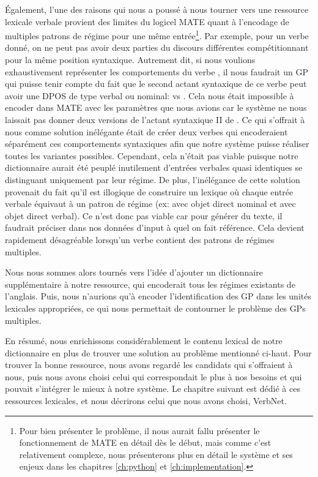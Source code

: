 Également, l'une des raisons qui nous a poussé à nous tourner vers une ressource lexicale verbale provient des limites du logicel MATE quant à l'encodage de multiples patrons de régime pour une même entrée\footnote{Pour bien présenter le problème, il nous aurait fallu présenter le fonctionnement de MATE en détail dès le début, mais comme c'est relativement complexe, nous présenterons plus en détail le système et ses enjeux dans les chapitres \ref{ch:python} et \ref{ch:implementation}.}. Par exemple, pour un verbe donné, on ne peut pas avoir deux parties du discours différentes compétitionnant pour la même position syntaxique. Autrement dit, si nous voulions exhaustivement représenter les comportements du verbe , il nous faudrait un \ac{GP} qui puisse tenir compte du fait que le second actant syntaxique de ce verbe peut avoir une \ac{DPOS} de type verbal ou nominal:  vs . Cela nous était impossible à encoder dans MATE avec les paramètres que nous avions car le système ne nous laissait pas donner deux versions de l'actant syntaxique II de . Ce qui s'offrait à nous comme solution inélégante était de créer deux verbes  qui encoderaient séparément ces comportements syntaxiques afin que notre système puisse réaliser toutes les variantes possibles. Cependant, cela n'était pas viable puisque notre dictionnaire aurait été peuplé inutilement d'entrées verbales quasi identiques se distinguant uniquement par leur régime. De plus, l'inélégance de cette solution provenait du fait qu'il est illogique de construire un lexique où chaque entrée verbale équivaut à un patron de régime (ex:  avec objet direct nominal et  avec objet direct verbal). Ce n'est donc pas viable car pour générer du texte, il faudrait préciser dans nos données d'input à quel  on fait référence. Cela devient rapidement désagréable lorsqu'un verbe contient des patrons de régimes multiples.

Nous nous sommes alors tournés vers l'idée d'ajouter un dictionnaire supplémentaire à notre ressource, qui encoderait tous les régimes existants de l'anglais. Puis, nous n'aurions qu'à encoder l'identification des \ac{GP} dans les unités lexicales appropriées, ce qui nous permettait de contourner le problème des \acp{GP} multiples.

En résumé, nous enrichissons considérablement le contenu lexical de notre dictionnaire en plus de trouver une solution au problème mentionné ci-haut. Pour trouver la bonne ressource, nous avons regardé les candidats qui s'offraient à nous, puis nous avons choisi celui qui correspondait le plus à nos besoins et qui pouvait s'intégrer le mieux à notre système. Le chapitre suivant est dédié à ces ressources lexicales, et nous décrirons celui que nous avons choisi, VerbNet.

